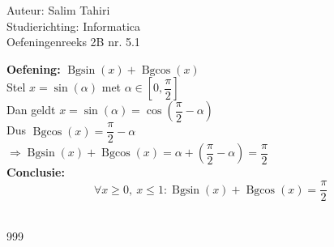 \documentclass[a4paper]{article}
\begin{document}
  
\noindent \large Auteur: Salim Tahiri\\
\noindent \large Studierichting: Informatica\\
\noindent \large Oefeningenreeks 2B nr. 5.1\\

\normalsize

\textbf{Oefening:} $ \operatorname{Bgsin}(x) + \operatorname{Bgcos}(x) $\\

Stel $ x = \sin(\alpha) $ met $ \alpha \in \left[0, \dfrac{\pi}{2}\right] $\\

Dan geldt $x = \sin\left(\alpha\right) = \cos\left(\dfrac{\pi}{2} - \alpha\right)$\\

Dus $\operatorname{Bgcos}(x) = \dfrac{\pi}{2} - \alpha$\\

$ \Rightarrow \operatorname{Bgsin}(x) + \operatorname{Bgcos}(x) = \alpha + \left(\dfrac{\pi}{2} - \alpha\right) = \dfrac{\pi}{2} $ \\

\textbf{Conclusie:} \\
$$ \forall x \ge 0,\ x \le 1 : \operatorname{Bgsin}(x) + \operatorname{Bgcos}(x) = \dfrac{\pi}{2} $$\\

\begin{thebibliography}{999}
\end{thebibliography}
\end{document}

